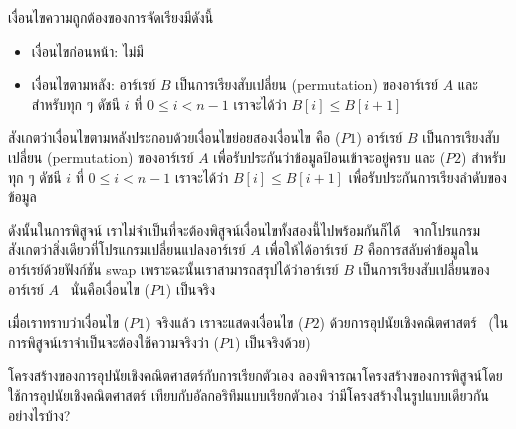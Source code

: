 เงื่อนไข{\wbr}ความ{\wbr}ถูกต้อง{\wbr}ของ{\wbr}การ{\wbr}จัดเรียง{\wbr}มี{\wbr}ดังนี้{\wbr}
\begin{itemize}
\item เงื่อนไข{\wbr}ก่อนหน้า: ไม่{\wbr}มี{\wbr}
\item เงื่อนไข{\wbr}ตาม{\wbr}หลัง: อาร์เรย์ $B$ เป็น{\wbr}การ{\wbr}เรียง{\wbr}สับเปลี่ยน (permutation) ของ{\wbr}อาร์เรย์ $A$ และ{\wbr}สำหรับ{\wbr}ทุก ๆ ดัชนี $i$ ที่ $0\leq i<n-1$ เรา{\wbr}จะ{\wbr}ได้{\wbr}ว่า $B[i]\leq B[i+1]$
\end{itemize}

สังเกต{\wbr}ว่า{\wbr}เงื่อนไข{\wbr}ตาม{\wbr}หลัง{\wbr}ประกอบ{\wbr}ด้วย{\wbr}เงื่อนไข{\wbr}ย่อย{\wbr}สอง{\wbr}เงื่อนไข คือ ($P1$) อาร์เรย์ $B$
เป็น{\wbr}การ{\wbr}เรียง{\wbr}สับเปลี่ยน (permutation) ของ{\wbr}อาร์เรย์ $A$
เพื่อ{\wbr}รับประกัน{\wbr}ว่า{\wbr}ข้อมูล{\wbr}ป้อน{\wbr}เข้า{\wbr}จะ{\wbr}อยู่{\wbr}ครบ และ ($P2$) สำหรับ{\wbr}ทุก ๆ ดัชนี $i$ ที่ $0\leq
i<n-1$ เรา{\wbr}จะ{\wbr}ได้{\wbr}ว่า $B[i]\leq B[i+1]$ เพื่อ{\wbr}รับประกัน{\wbr}การ{\wbr}เรียงลำดับ{\wbr}ของ{\wbr}ข้อมูล{\wbr}

ดังนั้น{\wbr}ใน{\wbr}การ{\wbr}พิสูจน์ เรา{\wbr}ไม่{\wbr}จำเป็น{\wbr}ที่{\wbr}จะ{\wbr}ต้อง{\wbr}พิสูจน์{\wbr}เงื่อนไข{\wbr}ทั้ง{\wbr}สอง{\wbr}นี้{\wbr}ไป{\wbr}พร้อมกัน{\wbr}ก็ได้ \ จาก{\wbr}โปรแกรม{\wbr}
สังเกต{\wbr}ว่า{\wbr}สิ่ง{\wbr}เดียว{\wbr}ที่{\wbr}โปรแกรม{\wbr}เปลี่ยนแปลง{\wbr}อาร์เรย์ $A$ เพื่อให้{\wbr}ได้{\wbr}อาร์เรย์ $B$
คือ{\wbr}การ{\wbr}สลับ{\wbr}ค่า{\wbr}ข้อมูล{\wbr}ใน{\wbr}อาร์เรย์{\wbr}ด้วย{\wbr}ฟังก์ชัน {\ct swap}
เพราะฉะนั้น{\wbr}เรา{\wbr}สามารถ{\wbr}สรุป{\wbr}ได้{\wbr}ว่า{\wbr}อาร์เรย์ $B$ เป็น{\wbr}การ{\wbr}เรียง{\wbr}สับเปลี่ยน{\wbr}ของ{\wbr}อาร์เรย์ $A$
\ นั่น{\wbr}คือ{\wbr}เงื่อนไข ($P1$) เป็นจริง{\wbr}

เมื่อ{\wbr}เรา{\wbr}ทราบ{\wbr}ว่า{\wbr}เงื่อนไข ($P1$) จริง{\wbr}แล้ว เรา{\wbr}จะ{\wbr}แสดง{\wbr}เงื่อนไข ($P2$)
ด้วย{\wbr}การ{\wbr}อุปนัย{\wbr}เชิง{\wbr}คณิตศาสตร์ \ (ใน{\wbr}การ{\wbr}พิสูจน์{\wbr}เรา{\wbr}จำเป็น{\wbr}จะ{\wbr}ต้อง{\wbr}ใช้{\wbr}ความจริง{\wbr}ว่า ($P1$)
เป็นจริง{\wbr}ด้วย)

\begin{quiz}{โครงสร้าง{\wbr}ของ{\wbr}การ{\wbr}อุปนัย{\wbr}เชิง{\wbr}คณิตศาสตร์{\wbr}กับ{\wbr}การ{\wbr}เรียก{\wbr}ตัวเอง}
ลอง{\wbr}พิจารณา{\wbr}โครงสร้าง{\wbr}ของ{\wbr}การ{\wbr}พิสูจน์{\wbr}โดย{\wbr}ใช้{\wbr}การ{\wbr}อุปนัย{\wbr}เชิง{\wbr}คณิตศาสตร์{\wbr}
เทียบ{\wbr}กับ{\wbr}อัล{\wbr}กอ{\wbr}ริ{\wbr}ทึม{\wbr}แบบ{\wbr}เรียก{\wbr}ตัวเอง ว่า{\wbr}มี{\wbr}โครงสร้าง{\wbr}ใน{\wbr}รูปแบบ{\wbr}เดียวกัน{\wbr}อย่างไร{\wbr}บ้าง?
\end{quiz}

